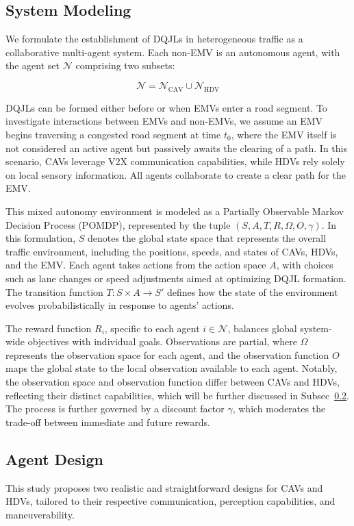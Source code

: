 \subsection{System Modeling}
\label{subsec:system_modeling}
We formulate the establishment of DQJLs in heterogeneous traffic as a collaborative multi-agent system. Each non-EMV is an autonomous agent, with the agent set $\mathcal{N}$ comprising two subsets:

\begin{equation}
\mathcal{N} = \mathcal{N}_{\text{CAV}} \cup \mathcal{N}_{\text{HDV}}
\end{equation}

DQJLs can be formed either before or when EMVs enter a road segment. To investigate interactions between EMVs and non-EMVs, we assume an EMV begins traversing a congested road segment at time $t_0$, where the EMV itself is not considered an active agent but passively awaits the clearing of a path. In this scenario, CAVs leverage V2X communication capabilities, while HDVs rely solely on local sensory information. All agents collaborate to create a clear path for the EMV.

This mixed autonomy environment is modeled as a Partially Observable Markov Decision Process (POMDP), represented by the tuple $(S, A, T, R, \Omega, O, \gamma)$. In this formulation, $S$ denotes the global state space that represents the overall traffic environment, including the positions, speeds, and states of CAVs, HDVs, and the EMV. Each agent takes actions from the action space $A$, with choices such as lane changes or speed adjustments aimed at optimizing DQJL formation. The transition function $T: S \times A \rightarrow S'$ defines how the state of the environment evolves probabilistically in response to agents' actions.

The reward function $R_i$, specific to each agent $i \in \mathcal{N}$, balances global system-wide objectives with individual goals. Observations are partial, where $\Omega$ represents the observation space for each agent, and the observation function $O$ maps the global state to the local observation available to each agent. Notably, the observation space and observation function differ between CAVs and HDVs, reflecting their distinct capabilities, which will be further discussed in Subsec~\ref{subsec:agent_design}. The process is further governed by a discount factor $\gamma$, which moderates the trade-off between immediate and future rewards.

\subsection{Agent Design}
\label{subsec:agent_design} 
This study proposes two realistic and straightforward designs for CAVs and HDVs, tailored to their respective communication, perception capabilities, and maneuverability. 

